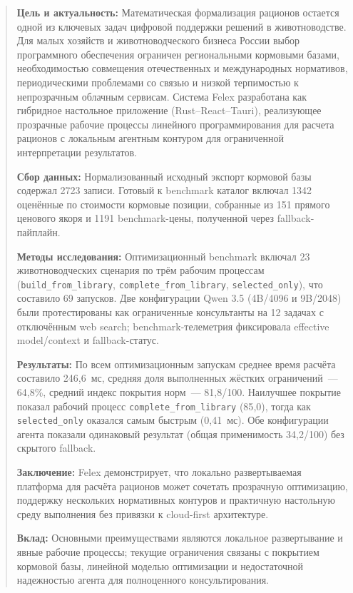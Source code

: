 \documentclass[a4paper,fleqn]{cas-sc}
\begin{document}
\begin{abstract}
\textbf{Цель и актуальность:} Математическая формализация рационов остается одной из ключевых задач цифровой поддержки решений в животноводстве. Для малых хозяйств и животноводческого бизнеса России выбор программного обеспечения ограничен региональными кормовыми базами, необходимостью совмещения отечественных и международных нормативов, периодическими проблемами со связью и низкой терпимостью к непрозрачным облачным сервисам. Система Felex разработана как гибридное настольное приложение (Rust--React--Tauri), реализующее прозрачные рабочие процессы линейного программирования для расчета рационов с локальным агентным контуром для ограниченной интерпретации результатов.

\textbf{Сбор данных:} Нормализованный исходный экспорт кормовой базы содержал 2723 записи. Готовый к benchmark каталог включал 1342 оценённые по стоимости кормовые позиции, собранные из 151 прямого ценового якоря и 1191 benchmark-цены, полученной через fallback-пайплайн.

\textbf{Методы исследования:} Оптимизационный benchmark включал 23 животноводческих сценария по трём рабочим процессам (\texttt{build\_from\_library}, \texttt{complete\_from\_library}, \texttt{selected\_only}), что составило 69 запусков. Две конфигурации Qwen 3.5 (4B/4096 и 9B/2048) были протестированы как ограниченные консультанты на 12 задачах с отключённым web search; benchmark-телеметрия фиксировала effective model/context и fallback-статус.

\textbf{Результаты:} По всем оптимизационным запускам среднее время расчёта составило 246{,}6~мс, средняя доля выполненных жёстких ограничений~--- 64{,}8\%, средний индекс покрытия норм~--- 81{,}8/100. Наилучшее покрытие показал рабочий процесс \texttt{complete\_from\_library} (85{,}0), тогда как \texttt{selected\_only} оказался самым быстрым (0{,}41~мс). Обе конфигурации агента показали одинаковый результат (общая применимость 34{,}2/100) без скрытого fallback.

\textbf{Заключение:} Felex демонстрирует, что локально развертываемая платформа для расчёта рационов может сочетать прозрачную оптимизацию, поддержку нескольких нормативных контуров и практичную настольную среду выполнения без привязки к cloud-first архитектуре.

\textbf{Вклад:} Основными преимуществами являются локальное развертывание и явные рабочие процессы; текущие ограничения связаны с покрытием кормовой базы, линейной моделью оптимизации и недостаточной надежностью агента для полноценного консультирования.
\end{abstract}
\end{document}
